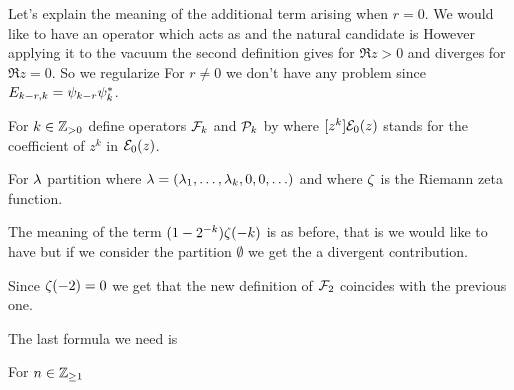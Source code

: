 \documentclass[10pt]{beamer}
\begin{document}
\begin{frame}

Let's explain the meaning of the additional term arising when $r=0$. We would like to have an operator which acts as
and the natural candidate is 
However applying it to the vacuum the second definition gives for $\Re z>0$
and diverges for $\Re z=0$. So we regularize
For $r\neq0$ we don't have any problem since $E_{k-r,k}=\psi_{k-r}\psi_k^*$.

\end{frame}

\begin{frame}

\begin{definition}
	For $k\in\mathbb Z_{>0}$ define operators $\mathcal F_k$ and $\mathcal P_k$ by
	where $[z^k]\mathcal E_0(z)$ stands for the coefficient of $z^k$ in $\mathcal E_0(z)$. 
\end{definition}

\begin{lemma}
	For $\lambda$ partition
	where $\lambda=(\lambda_1,\ldots,\lambda_k,0,0,\ldots)$ and
	where $\zeta$ is the Riemann zeta function.
\end{lemma}

\end{frame}

\begin{frame}

The meaning of the term $(1-2^{-k})\zeta(-k)$ is as before, that is we would like to have
but if we consider the partition $\emptyset$ we get the a divergent contribution.

Since $\zeta(-2)=0$ we get that the new definition of $\mathcal F_2$ coincides with the previous one.

The last formula we need is 
\begin{lemma}
	For $n\in\mathbb Z_{\geq1}$
\end{lemma}

\end{frame}
\end{document}
